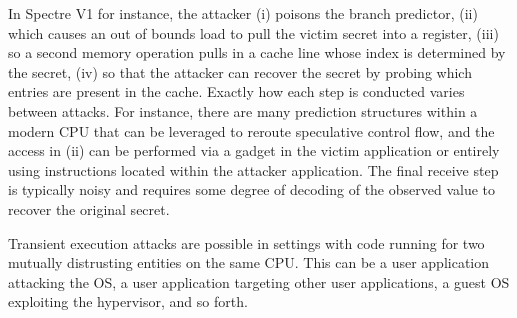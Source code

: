 In Spectre V1 for instance, the attacker (i) poisons the branch predictor, (ii) which causes an out of bounds load to pull the victim secret into a register, (iii) so a second memory operation pulls in a cache line whose index is determined by the secret, (iv) so that the attacker can recover the secret by probing which entries are present in the cache.
Exactly how each step is conducted varies between attacks.
For instance, there are many prediction structures within a modern CPU that can be leveraged to reroute speculative control flow, and the access in (ii) can be performed via a gadget in the victim application or entirely using instructions located within the attacker application.
The final receive step is typically noisy and requires some degree of decoding of the observed value to recover the original secret.

Transient execution attacks are possible in settings with code running for two mutually distrusting entities on the same CPU.
This can be a user application attacking the OS, a user application targeting other user applications, a guest OS exploiting the hypervisor, and so forth.






